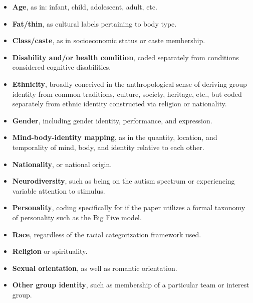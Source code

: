 \begin{itemize}
\item \textbf{Age}, as in: infant, child, adolescent, adult, etc. 
\item \textbf{Fat/thin}, as cultural labels pertaining to body type. 
\item \textbf{Class/caste}, as in socioeconomic status or caste membership. 
\item \textbf{Disability and/or health condition}, coded separately from conditions considered cognitive disabilities.
\item \textbf{Ethnicity}, broadly conceived in the anthropological sense of deriving group identity from common traditions, culture, society, heritage, etc., but coded separately from ethnic identity constructed via religion or nationality.
\item \textbf{Gender}, including gender identity, performance, and expression.
\item \textbf{Mind-body-identity mapping}, as in the quantity, location, and temporality of mind, body, and identity relative to each other.
\item \textbf{Nationality}, or national origin. 
\item \textbf{Neurodiversity}, such as being on the autism spectrum or experiencing variable attention to stimulus.
\item \textbf{Personality}, coding specifically for if the paper utilizes a formal taxonomy of personality such as the Big Five model.
\item \textbf{Race}, regardless of the racial categorization framework used.
\item \textbf{Religion} or spirituality.
\item \textbf{Sexual orientation}, as well as romantic orientation. 
\item \textbf{Other group identity}, such as membership of a particular team or interest group.
\end{itemize}
